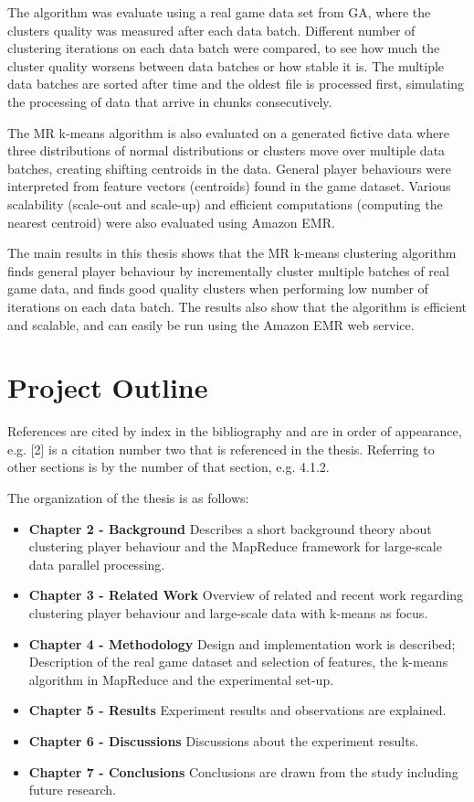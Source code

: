 The algorithm was evaluate using a real game data set from GA, where the clusters quality was measured after each data batch. Different number of clustering iterations on each data batch were compared, to see how much the cluster quality worsens between data batches or how stable it is. The multiple data batches are sorted after time and the oldest file is processed first, simulating the processing of data that arrive in chunks consecutively. 

The MR k-means algorithm is also evaluated on a generated fictive data where three distributions of normal distributions or clusters move over multiple data batches, creating shifting centroids in the data. General player behaviours were interpreted from feature vectors (centroids) found in the game dataset. Various scalability (scale-out and scale-up) and efficient computations (computing the nearest centroid) were also evaluated using Amazon EMR.

The main results in this thesis shows that the MR k-means clustering algorithm finds general player behaviour by incrementally cluster multiple batches of real game data, and finds good quality clusters when performing low number of iterations on each data batch. The results also show that the algorithm is efficient and scalable, and can easily be run using the Amazon EMR web service.

\section{Project Outline}
References are cited by index in the bibliography and are in order of appearance, e.g. [2] is a citation number two that is referenced in the thesis. Referring to other sections is by the number of that section, e.g. 4.1.2.

The organization of the thesis is as follows: 
\begin{itemize}
\item \textbf{Chapter 2 - Background} Describes a short background theory about clustering player behaviour and the MapReduce framework for large-scale data parallel processing.
\item \textbf{Chapter 3 - Related Work} Overview of related and recent work regarding clustering player behaviour and large-scale data with k-means as focus.
\item \textbf{Chapter 4 - Methodology} Design and implementation work is described; Description of the real game dataset and selection of features, the k-means algorithm in MapReduce and the experimental set-up.
\item \textbf{Chapter 5 - Results} Experiment results and observations are explained.
\item \textbf{Chapter 6 - Discussions} Discussions about the experiment results.
\item \textbf{Chapter 7 - Conclusions} Conclusions are drawn from the study including future research.
\end{itemize}
